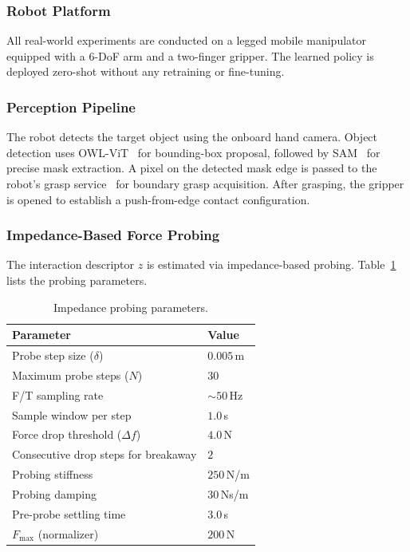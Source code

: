\subsubsection{Robot Platform}

All real-world experiments are conducted on a legged mobile manipulator equipped with a 6-DoF arm and a two-finger gripper.
The learned policy is deployed zero-shot without any retraining or fine-tuning.

\subsubsection{Perception Pipeline}

The robot detects the target object using the onboard hand camera.
Object detection uses OWL-ViT~\cite{minderer2022simple} for bounding-box proposal, followed by SAM~\cite{kirillov2023segment} for precise mask extraction.
A pixel on the detected mask edge is passed to the robot's grasp service~\cite{spotsdk2024} for boundary grasp acquisition.
After grasping, the gripper is opened to establish a push-from-edge contact configuration.

\subsubsection{Impedance-Based Force Probing}

The interaction descriptor $z$ is estimated via impedance-based probing.
Table~\ref{tab:probe_params} lists the probing parameters.

\begin{table}[h]
\centering
\caption{Impedance probing parameters.}
\label{tab:probe_params}
\begin{tabular}{ll}
\toprule
\textbf{Parameter}                     & \textbf{Value}         \\
\midrule
Probe step size ($\delta$)             & $0.005$\,m             \\
Maximum probe steps ($N$)              & $30$                   \\
F/T sampling rate                      & $\sim\!50$\,Hz         \\
Sample window per step                 & $1.0$\,s               \\
Force drop threshold ($\Delta f$)      & $4.0$\,N               \\
Consecutive drop steps for breakaway   & $2$                    \\
Probing stiffness                      & $250$\,N/m             \\
Probing damping                        & $30$\,Ns/m             \\
Pre-probe settling time                & $3.0$\,s               \\
$F_{\max}$ (normalizer)               & $200$\,N               \\
\bottomrule
\end{tabular}
\end{table}

